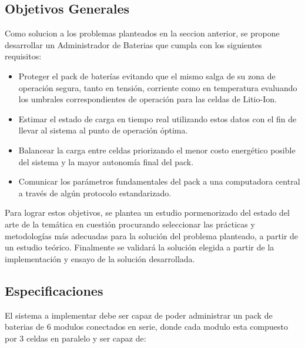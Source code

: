 \documentclass[10pt,a4paper]{article}
\begin{document}
	\subsection{Objetivos Generales}

    Como solucion a los problemas planteados en la seccion anterior, se propone
	desarrollar un Administrador de Baterias que cumpla con los siguientes
    requisitos:

    \begin{itemize}
        \item Proteger el pack de baterías evitando que el mismo salga de su 
        zona de operación segura, tanto en tensión, corriente como en 
        temperatura evaluando los umbrales correspondientes de operación para 
        las celdas de Litio-Ion.
        \item Estimar el estado de carga en tiempo real utilizando estos datos 
        con el fin de llevar al sistema al punto de operación óptima.
        \item Balancear la carga entre celdas priorizando el menor costo 
        energético posible del sistema y la mayor autonomía final del pack.
        \item Comunicar los parámetros fundamentales del pack a una computadora 
        central a través de algún protocolo estandarizado.
    \end{itemize}

	\noindent Para lograr estos objetivos, se plantea un estudio pormenorizado 
    del estado del arte de la temática en cuestión procurando seleccionar las 
    prácticas y metodologías más adecuadas para la solución del problema 
    planteado, a partir de un estudio teórico. Finalmente se validará la 
    solución elegida a partir de la implementación y ensayo de la solución 
    desarrollada.
	
	\subsection{Especificaciones}

    \noindent El sistema a implementar debe ser capaz de poder administrar un 
    pack de baterias de 6 modulos conectados en serie, donde cada modulo esta 
    compuesto por 3 celdas en paralelo y ser capaz de:
	
\end{document}
